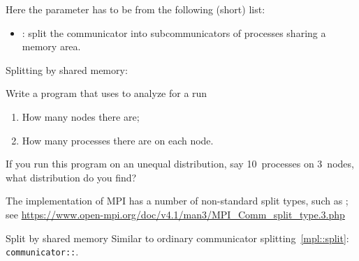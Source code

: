 Here the  parameter has to be from the following (short) list:
\begin{itemize}
\item {}: split the communicator into subcommunicators
  of processes sharing a memory area.
\end{itemize}

Splitting by shared memory:
%
\begingroup
\def\snippetcodefraction{.45}
\def\snippettextfraction{.5}
\endgroup

\begin{exercise}
  \label{ex:mpi-node-proc-split}
  Write a program that uses 
  to  analyze for a run
  \begin{enumerate}
  \item How many nodes there are;
  \item How many processes there are on each node.
  \end{enumerate}
  If you run this program on an unequal distribution,
  say 10~processes on 3~nodes, what distribution do you find?
  
\end{exercise}

\begin{remark}
  The  implementation of MPI has a number of
  non-standard split types, such as ;
  see \url{https://www.open-mpi.org/doc/v4.1/man3/MPI_Comm_split_type.3.php}
\end{remark}

\begin{mplnote}{Split by shared memory}
  Similar to ordinary communicator splitting~\ref{mpl::split}:
  \lstinline+communicator::+.
\end{mplnote}

